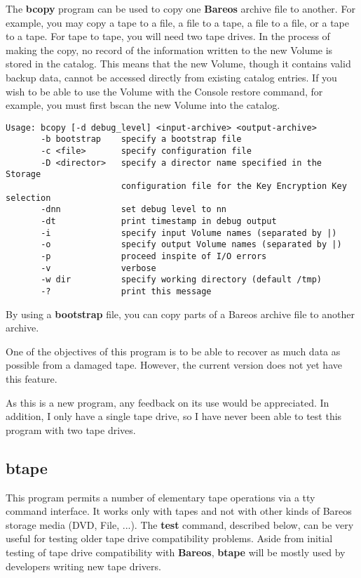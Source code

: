 The {\bf bcopy} program can be used to copy one {\bf Bareos} archive file to
another. For example, you may copy a tape to a file, a file to a tape, a file
to a file, or a tape to a tape. For tape to tape, you will need two tape
drives. In the
process of making the copy, no record of the information written to the new
Volume is stored in the catalog. This means that the new Volume, though it
contains valid backup data, cannot be accessed directly from existing catalog
entries. If you wish to be able to use the Volume with the Console restore
command, for example, you must first bscan the new Volume into the catalog.

\footnotesize
\begin{verbatim}
Usage: bcopy [-d debug_level] <input-archive> <output-archive>
       -b bootstrap    specify a bootstrap file
       -c <file>       specify configuration file
       -D <director>   specify a director name specified in the Storage
                       configuration file for the Key Encryption Key selection
       -dnn            set debug level to nn
       -dt             print timestamp in debug output
       -i              specify input Volume names (separated by |)
       -o              specify output Volume names (separated by |)
       -p              proceed inspite of I/O errors
       -v              verbose
       -w dir          specify working directory (default /tmp)
       -?              print this message
\end{verbatim}
\normalsize

By using a {\bf bootstrap} file, you can copy parts of a Bareos archive file
to another archive.

One of the objectives of this program is to be able to recover as much data as
possible from a damaged tape. However, the current version does not yet have
this feature.

As this is a new program, any feedback on its use would be appreciated. In
addition, I only have a single tape drive, so I have never been able to test
this program with two tape drives.

\subsection{btape}
\label{btape}

This program permits a number of elementary tape operations via a tty command
interface. It works only with tapes and not with other kinds of Bareos
storage media (DVD, File, ...).
The {\bf test} command, described below,
can be very useful for testing older tape drive compatibility problems.
Aside from initial testing of tape drive compatibility with {\bf Bareos},
{\bf btape} will be mostly used by developers writing new tape drivers.

